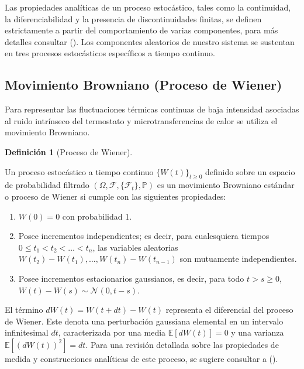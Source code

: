 \documentclass[
  spanish,
  letterpaper,
  DIV=11,
  numbers=noendperiod]{scrreprt}
\providecommand{\tightlist}{%
  \setlength{\itemsep}{0pt}\setlength{\parskip}{0pt}}
\theoremstyle{plain}
\theoremstyle{definition}
\newtheorem{definition}{Definición}[chapter]
\theoremstyle{remark}
\begin{document}
Las propiedades analíticas de un proceso estocástico, tales como la
continuidad, la diferenciabilidad y la presencia de discontinuidades
finitas, se definen estrictamente a partir del comportamiento de varias
componentes, para más detalles consultar
(). Los
componentes aleatorios de nuestro sistema se sustentan en tres procesos
estocásticos específicos a tiempo continuo.

\subsection{Movimiento Browniano (Proceso de
Wiener)}\label{movimiento-browniano-proceso-de-wiener}

Para representar las fluctuaciones térmicas continuas de baja intensidad
asociadas al ruido intrínseco del termostato y microtransferencias de
calor se utiliza el movimiento Browniano.

\begin{definition}[Proceso de
Wiener]\protect\hypertarget{def-movimiento-browniano}{}\label{def-movimiento-browniano}

Un proceso estocástico a tiempo continuo \(\{W(t)\}_{t \ge 0}\) definido
sobre un espacio de probabilidad filtrado
\((\Omega, \mathcal{F}, \{\mathcal{F}_t\}, \mathbb{P})\) es un
movimiento Browniano estándar o proceso de Wiener si cumple con las
siguientes propiedades:

\begin{enumerate}
\def\labelenumi{\arabic{enumi}.}
\tightlist
\item
  \(W(0) = 0\) con probabilidad 1.
\item
  Posee incrementos independientes; es decir, para cualesquiera tiempos
  \(0 \le t_1 < t_2 < \dots < t_n\), las variables aleatorias
  \(W(t_2)-W(t_1), \dots, W(t_n)-W(t_{n-1})\) son mutuamente
  independientes.
\item
  Posee incrementos estacionarios gaussianos, es decir, para todo
  \(t > s \ge 0\), \(W(t) - W(s) \sim \mathcal{N}(0, t-s)\).
\end{enumerate}

\end{definition}

El término \(dW(t) = W(t+dt) - W(t)\) representa el diferencial del
proceso de Wiener. Este denota una perturbación gaussiana elemental en
un intervalo infinitesimal \(dt\), caracterizada por una media
\(\mathbb{E}[dW(t)] = 0\) y una varianza \(\mathbb{E}[(dW(t))^2] = dt\).
Para una revisión detallada sobre las propiedades de medida y
construcciones analíticas de este proceso, se sugiere consultar a
().
\end{document}
